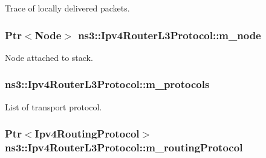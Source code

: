 Trace of locally delivered packets. 

\hypertarget{classns3_1_1Ipv4RouterL3Protocol_ab30fadcb1d2a60537c41092b9f722bab}{
\subsubsection[{m\-\_\-node}]{\setlength{\rightskip}{0pt plus 5cm}Ptr$<$Node$>$ ns3\-::\-Ipv4\-Router\-L3\-Protocol\-::m\-\_\-node\hspace{0.3cm}{\ttfamily [private]}}}\label{classns3_1_1Ipv4RouterL3Protocol_ab30fadcb1d2a60537c41092b9f722bab}


Node attached to stack. 

\hypertarget{classns3_1_1Ipv4RouterL3Protocol_ad714caec33f35a317af6fd596c6ff1f0}{
\subsubsection[{m\-\_\-protocols}]{ ns3\-::\-Ipv4\-Router\-L3\-Protocol\-::m\-\_\-protocols\hspace{0.3cm}{\ttfamily [private]}}}\label{classns3_1_1Ipv4RouterL3Protocol_ad714caec33f35a317af6fd596c6ff1f0}


List of transport protocol. 

\hypertarget{classns3_1_1Ipv4RouterL3Protocol_a06835e8c56b7c1ab3efce79e6fb6a10a}{
\subsubsection[{m\-\_\-routing\-Protocol}]{\setlength{\rightskip}{0pt plus 5cm}Ptr$<$Ipv4\-Routing\-Protocol$>$ ns3\-::\-Ipv4\-Router\-L3\-Protocol\-::m\-\_\-routing\-Protocol\hspace{0.3cm}{\ttfamily [private]}}}\label{classns3_1_1Ipv4RouterL3Protocol_a06835e8c56b7c1ab3efce79e6fb6a10a}


